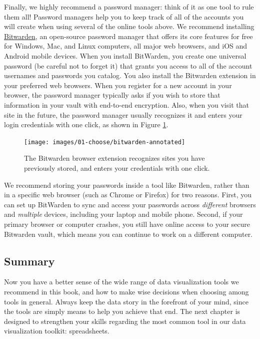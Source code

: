 \documentclass[
  english,
]{book}
\begin{document}
Finally, we highly recommend a password manager: think of it as one tool to rule them all! Password managers help you to keep track of all of the accounts you will create when using several of the online tools above. We recommend installing \href{https://bitwarden.com}{Bitwarden}, an open-source password manager that offers its core features for free for Windows, Mac, and Linux computers, all major web browsers, and iOS and Android mobile devices. When you install BitWarden, you create one universal password (be careful not to forget it) that grants you access to all of the account usernames and passwords you catalog. You also install the Bitwarden extension in your preferred web browsers. When you register for a new account in your browser, the password manager typically asks if you wish to store that information in your vault with end-to-end encryption. Also, when you visit that site in the future, the password manager usually recognizes it and enters your login credentials with one click, as shown in Figure \ref{fig:bitwarden-annotated}.



\begin{figure}
\texttt{[image: images/01-choose/bitwarden-annotated]} \caption{The Bitwarden browser extension recognizes sites you have previously stored, and enters your credentials with one click.}\label{fig:bitwarden-annotated}
\end{figure}

We recommend storing your passwords inside a tool like Bitwarden, rather than in a specific web browser (such as Chrome or Firefox) for two reasons. First, you can set up BitWarden to sync and access your passwords across \emph{different} browsers and \emph{multiple} devices, including your laptop and mobile phone. Second, if your primary browser or computer crashes, you still have online access to your secure Bitwarden vault, which means you can continue to work on a different computer.

\hypertarget{summary1}{%
\subsection*{Summary}\label{summary1}}

Now you have a better sense of the wide range of data visualization tools we recommend in this book, and how to make wise decisions when choosing among tools in general. Always keep the data story in the forefront of your mind, since the tools are simply means to help you achieve that end. The next chapter is designed to strengthen your skills regarding the most common tool in our data visualization toolkit: spreadsheets.
\end{document}
